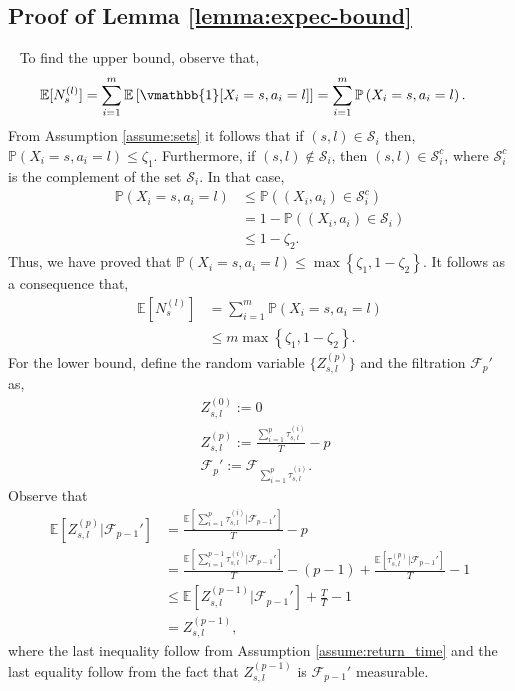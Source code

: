 \documentclass[opre,sglanonrev]{informs4}
\numberwithin{equation}{section}
\newcommand{\pow}[1]{^{(#1)}}
\newcommand{\lp}{\left(}
\newcommand{\rp}{\right)}
\newcommand{\lc}{\left\{}
\newcommand{\rc}{\right\}}
\newcommand{\lb}{\left[}
\newcommand{\rb}{\right]}
\newcommand{\Pbb}{\mathbb{P}}
\newcommand{\Fcal}{\mathcal{F}}
\newcommand{\Scal}{\mathcal{S}}
\newcommand{\prob}{\Pbb}
\newcommand{\expec}{\mathbb{E}}
\newcommand{\indicator}{\vmathbb{1}}
\begin{document}
\begin{APPENDICES}
\subsection{Proof of Lemma \ref{lemma:expec-bound}}~\label{sec:prf-expbd}
To find the upper bound, observe that,
\begin{align*}
    \expec[N_s\pow{l}]=\sum_{i=1}^m\expec\lb\indicator[X_i=s,a_i=l]\rb & =\sum_{i=1}^m\prob\lp X_i=s,a_i=l \rp. 
\end{align*}
From Assumption \ref{assume:sets} it follows that if $(s,l)\in\Scal_i$ then, $\prob\lp X_i=s,a_i=l \rp\leq \zeta_1$. Furthermore, if $(s,l)\notin\Scal_i$, then $(s,l)\in\Scal_i^c$, where $\Scal_i^c$ is the complement of the set $\Scal_i$. In that case, 
\begin{align*}
    \prob\lp X_i=s,a_i=l\rp & \leq \prob\lp (X_i,a_i)\in \Scal_i^c\rp\\ 
    & = 1 -  \prob\lp (X_i,a_i)\in \Scal_i\rp\\ 
    & \leq 1-\zeta_2.
\end{align*}
Thus, we have proved that $\prob\lp X_i=s,a_i=l \rp\leq \max\lc \zeta_1,1-\zeta_2 \rc$. It follows as a consequence that,
\begin{align*}
    \expec[N_s\pow{l}] & =\sum_{i=1}^m\prob\lp X_i=s,a_i=l \rp\\ 
    & \leq m\max\lc \zeta_1,1-\zeta_2 \rc.
\end{align*}
For the lower bound, define the random variable $\{Z_{s,l}\pow{p}\}$ and the filtration $\Fcal_p'$ as,
\begin{align*}
    & Z_{s,l}\pow{0} := 0\\
    & Z_{s,l}\pow{p} := \frac{\sum_{i=1}^p\tau_{s,l}\pow{i}}{T}-p\\
    & \Fcal_p':=\Fcal_{\sum_{i=1}^p\tau_{s,l}\pow{i}}.
\end{align*}
Observe that 
\begin{align*}
    \expec[ Z_{s,l}\pow{p}|\Fcal_{p-1}'] & =\frac{\expec[\sum_{i=1}^p\tau_{s,l}\pow{i}|\Fcal_{p-1}']}{T}-p\\
    & = \frac{\expec[\sum_{i=1}^{p-1}\tau_{s,l}\pow{i}|\Fcal_{p-1}']}{T}-(p-1)+\frac{\expec[\tau_{s,l}\pow{p}|\Fcal_{p-1}']}{T}-1\\
    & \leq \expec[{Z_{s,l}\pow{p-1}}|\Fcal_{p-1}']+\frac{T}{T}-1\\
    & =Z_{s,l}\pow{p-1},
\end{align*}
where the last inequality follow from Assumption \ref{assume:return_time} and the last equality follow from the fact that $Z_{s,l}\pow{p-1}$ is $\Fcal_{p-1}'$ measurable.

\end{APPENDICES}
\end{document}
